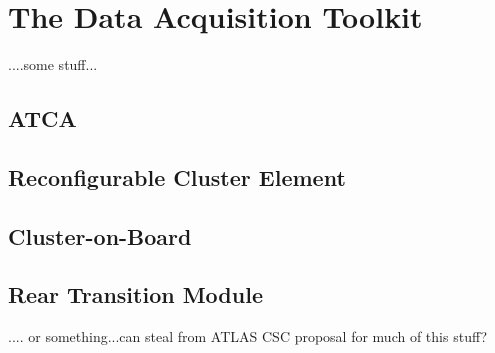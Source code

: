 \section{The Data Acquisition Toolkit}

....some stuff...

\subsection{ATCA}

\subsection{Reconfigurable Cluster Element}

\subsection{Cluster-on-Board}

\subsection{Rear Transition Module}


.... or something...can steal from ATLAS CSC proposal for much of this stuff?